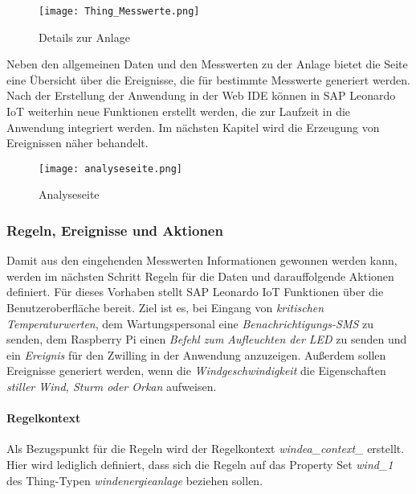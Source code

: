 \begin{figure}[H]
  \centering
  \texttt{[image: Thing\_Messwerte.png]}
  \caption{Details zur Anlage}
  \label{thingpage}
\end{figure}

\noindent Neben den allgemeinen Daten und den Messwerten zu der Anlage bietet die Seite eine Übersicht über die Ereignisse, die für bestimmte Messwerte generiert werden. Nach der Erstellung der Anwendung in der Web IDE können in SAP Leonardo IoT weiterhin neue Funktionen erstellt werden, die zur Laufzeit in die Anwendung integriert werden. Im nächsten Kapitel wird die Erzeugung von Ereignissen näher behandelt. 

\begin{figure}[H]
  \centering
  \texttt{[image: analyseseite.png]}
  \caption{Analyseseite}
  \label{analyse}
\end{figure}


\subsubsection{Regeln, Ereignisse und Aktionen}
Damit aus den eingehenden Messwerten Informationen gewonnen werden kann, werden im nächsten Schritt Regeln für die Daten und darauffolgende Aktionen definiert. Für dieses Vorhaben stellt SAP Leonardo IoT Funktionen über die Benutzeroberfläche bereit. Ziel ist es, bei Eingang von \textit{kritischen Temperaturwerten}, dem Wartungspersonal eine \textit{Benachrichtigungs-SMS} zu senden, dem Raspberry Pi einen \textit{Befehl zum Aufleuchten der LED} zu senden und ein \textit{Ereignis} für den Zwilling in der Anwendung anzuzeigen. Außerdem sollen Ereignisse generiert werden, wenn die \textit{Windgeschwindigkeit} die Eigenschaften \textit{stiller Wind, Sturm oder Orkan} aufweisen. 

\paragraph{Regelkontext}
Als Bezugspunkt für die Regeln wird der Regelkontext \textit{windea\_context\_} erstellt. Hier wird lediglich definiert, dass sich die Regeln auf das Property Set \textit{wind\_1} des Thing-Typen \textit{windenergieanlage} beziehen sollen.

